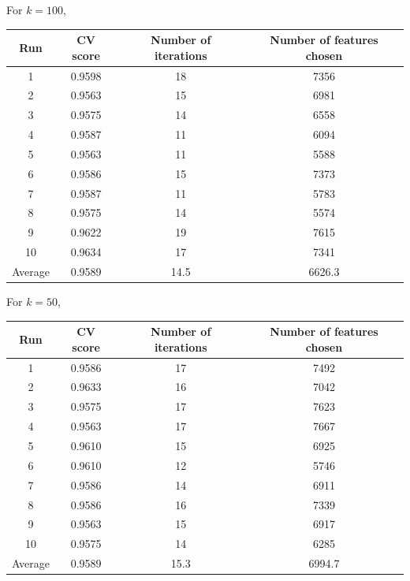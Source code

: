 \documentclass[12pt, twoside, a4paper]{report}
\begin{document}
For $k=100$,
\begin{center}
    \begin{tabular}{| c | c | c | c | } \hline
    Run & CV score & Number of iterations & Number of features chosen \\ \hline \hline
    1 & 0.9598 & 18 & 7356 \\ \hline
	2 & 0.9563  & 15 & 6981 \\ \hline
	3 & 0.9575 & 14 & 6558 \\ \hline
	4 & 0.9587 & 11 & 6094 \\ \hline
	5 & 0.9563 & 11 & 5588 \\ \hline
	6 & 0.9586 & 15 & 7373 \\ \hline
	7 & 0.9587 & 11 & 5783 \\ \hline
	8 & 0.9575 & 14 & 5574 \\ \hline
	9 & 0.9622 & 19 & 7615 \\ \hline
	10 & 0.9634 & 17 & 7341 \\ \hline
	Average & 0.9589 & 14.5 & 6626.3 \\ \hline
    \end{tabular}
\end{center}


For $k=50$,
\begin{center}
    \begin{tabular}{| c | c | c | c | } \hline
    Run & CV score & Number of iterations & Number of features chosen \\ \hline \hline
    1 & 0.9586 & 17 & 7492 \\ \hline
	2 & 0.9633 & 16 & 7042 \\ \hline
	3 & 0.9575 & 17 & 7623 \\ \hline
	4 & 0.9563 & 17 & 7667 \\ \hline
	5 & 0.9610 & 15 & 6925 \\ \hline
	6 & 0.9610 & 12 & 5746 \\ \hline
	7 & 0.9586 & 14 & 6911 \\ \hline
	8 & 0.9586 & 16 & 7339 \\ \hline
	9 & 0.9563 & 15 & 6917 \\ \hline
	10 & 0.9575 & 14 & 6285 \\ \hline
	Average & 0.9589 & 15.3 & 6994.7 \\ \hline
    \end{tabular}
\end{center}
\end{document}
